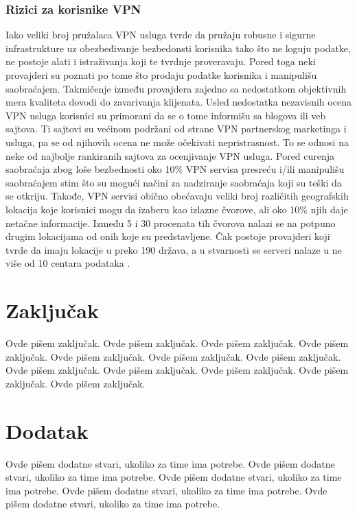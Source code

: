 \documentclass[a4paper]{article}
\begin{document}
\subsubsection{Rizici za korisnike VPN} 
\label{subsec:riziciVPN}
Iako veliki broj pružalaca VPN usluga  tvrde da pružaju robusne i sigurne infrastrukture uz obezbeđivanje bezbedonsti korisnika tako što ne loguju podatke, ne postoje alati i istraživanja koji te tvrdnje proveravaju. Pored toga neki provajderi su poznati po tome što prodaju podatke korisnika i manipulišu saobraćajem. Takmičenje između provajdera zajedno sa nedostatkom objektivnih mera kvaliteta dovodi do zavarivanja klijenata. Usled nedostatka nezavisnih ocena VPN usluga korisnici su primorani da se o tome informišu sa blogova ili veb sajtova. Ti sajtovi su većinom podržani od strane VPN partnerskog marketinga i usluga, pa se od njihovih ocena ne može očekivati nepristrasnost. To se odnosi na neke od najbolje rankiranih sajtova za ocenjivanje VPN usluga. Pored curenja saobraćaja zbog loše bezbednosti oko 10\% VPN servisa presreću i/ili manipulišu saobraćajem stim što su mogući načini za nadziranje saobraćaja koji su teški da se otkriju. Takođe, VPN servisi obično obećavaju veliki broj različitih geografskih lokacija koje korisnici mogu da izaberu kao izlazne čvorove, ali oko 10\% njih daje netačne informacije. Između 5 i 30 procenata tih čvorova nalazi se na potpuno drugim lokacijama od onih koje su predstavljene. Čak postoje provajderi koji tvrde da imaju lokacije u preko 190 država, a u stvarnosti se serveri nalaze u ne više od 10 centara podataka \cite{vpn5}.












\section{Zaključak}
\label{sec:zakljucak}

Ovde pišem zaključak. 
Ovde pišem zaključak. 
Ovde pišem zaključak. 
Ovde pišem zaključak. 
Ovde pišem zaključak. 
Ovde pišem zaključak. 
Ovde pišem zaključak. 
Ovde pišem zaključak. 
Ovde pišem zaključak. 
Ovde pišem zaključak. 
Ovde pišem zaključak. 
Ovde pišem zaključak. 


\appendix
 


\appendix
\section{Dodatak}
Ovde pišem dodatne stvari, ukoliko za time ima potrebe.
Ovde pišem dodatne stvari, ukoliko za time ima potrebe.
Ovde pišem dodatne stvari, ukoliko za time ima potrebe.
Ovde pišem dodatne stvari, ukoliko za time ima potrebe.
Ovde pišem dodatne stvari, ukoliko za time ima potrebe.
\end{document}
